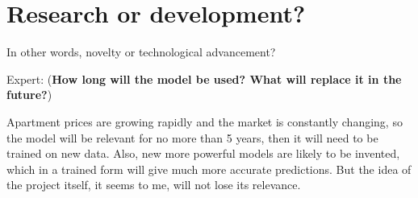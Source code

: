 \documentclass[12pt]{article}
\begin{document}
\section{Research or development?}
In other words, novelty or technological advancement?



{Expert:} (\textbf{How long will the model be used? What will replace it in the future?})

Apartment prices are growing rapidly and the market is constantly changing, so the model will be relevant for no more than 5 years, then it will need to be trained on new data. Also, new more powerful models are likely to be invented, which in a trained form will give much more accurate predictions. But the idea of the project itself, it seems to me, will not lose its relevance.

%
%
\end{document}
